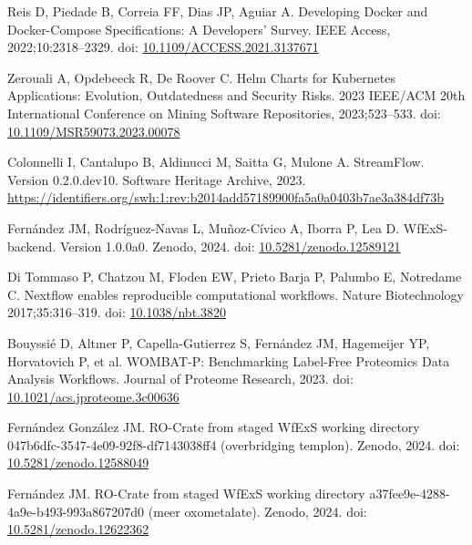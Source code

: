 \documentclass[10pt,letterpaper]{article}
\begin{document}
\begin{thebibliography}{10}
\begin{small}
Reis D, Piedade B, Correia FF, Dias JP, Aguiar A.
Developing Docker and Docker-Compose Specifications: A Developers’ Survey.
IEEE Access, 2022;10:2318--2329.
doi: \href{https://doi.org/10.1109/ACCESS.2021.3137671}{10.1109/ACCESS.2021.3137671}

Zerouali A, Opdebeeck R, De Roover C.
Helm Charts for Kubernetes Applications: Evolution, Outdatedness and Security Risks.
2023 IEEE/ACM 20th International Conference on Mining Software Repositories, 2023;523--533.
doi: \href{https://doi.org/10.1109/MSR59073.2023.00078}{10.1109/MSR59073.2023.00078}

Colonnelli I, Cantalupo B, Aldinucci M, Saitta G, Mulone A.
StreamFlow. Version 0.2.0.dev10.
Software Heritage Archive, 2023.
\url{https://identifiers.org/swh:1:rev:b2014add57189900fa5a0a0403b7ae3a384df73b}

Fernández JM, Rodríguez-Navas L, Muñoz-Cívico A, Iborra P, Lea D.
WfExS-backend. Version 1.0.0a0.
Zenodo, 2024.
doi: \href{https://doi.org/10.5281/zenodo.12589121}{10.5281/zenodo.12589121}

Di Tommaso P, Chatzou M, Floden EW, Prieto Barja P, Palumbo E, Notredame C.
Nextflow enables reproducible computational workflows.
Nature Biotechnology 2017;35:316–319.
doi: \href{https://doi.org/10.1038/nbt.3820}{10.1038/nbt.3820}

Bouyssié D, Altıner P, Capella-Gutierrez S, Fernández JM, Hagemeijer YP, Horvatovich P, et al.
WOMBAT-P: Benchmarking Label-Free Proteomics Data Analysis Workflows.
Journal of Proteome Research, 2023.
doi: \href{https://doi.org/10.1021/acs.jproteome.3c00636}{10.1021/acs.jproteome.3c00636}

Fernández González JM.
RO-Crate from staged WfExS working directory 047b6dfc-3547-4e09-92f8-df7143038ff4 (overbridging templon).
Zenodo, 2024.
doi: \href{https://doi.org/10.5281/zenodo.12588049}{10.5281/zenodo.12588049}

Fernández JM.
RO-Crate from staged WfExS working directory a37fee9e-4288-4a9e-b493-993a867207d0 (meer oxometalate).
Zenodo, 2024.
doi: \href{https://doi.org/10.5281/zenodo.12622362}{10.5281/zenodo.12622362}



\end{small}
\end{thebibliography}
\end{document}
